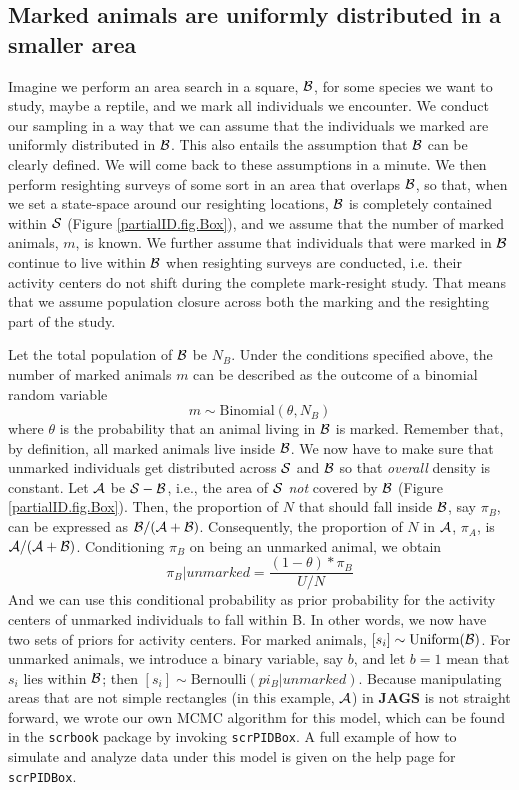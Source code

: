 \subsection{Marked animals are uniformly distributed in a smaller area}
Imagine we perform an area search in a square, ${\cal B}$, for some species we want to study, maybe a reptile, and we mark all individuals we encounter. We conduct our sampling in a way that we can assume that the individuals we marked are uniformly distributed in ${\cal B}$. This also entails the assumption that ${\cal B}$ can be clearly defined. We will come back to these assumptions in a minute. We then perform resighting surveys of some sort in an area that overlaps ${\cal B}$, so that, when we set a state-space around our resighting locations, ${\cal B}$ is completely contained within ${\cal S}$ (Figure \ref{partialID.fig.Box}), and we assume that the number of marked animals, $m$, is known. We further assume that individuals that were marked in ${\cal B}$ continue to live within ${\cal B}$ when resighting surveys are conducted, i.e. their activity centers do not shift during the complete mark-resight study. That means that we assume population closure across both the marking and the resighting part of the study.

Let the total population of ${\cal B}$ be $N_B$.
Under the conditions specified above, the number of marked animals $m$ can be described as the outcome of a binomial random variable
\[
m \sim \mbox{Binomial}(\theta, N_B)
\]
where $\theta$ is the probability that an animal living in ${\cal B}$ is marked. Remember that, by definition, all marked animals live inside ${\cal B}$. We now have to make sure that unmarked individuals get distributed across ${\cal S}$ and ${\cal B}$ so that \emph{overall} density is constant.
Let ${\cal A}$ be ${\cal S} - {\cal B}$, i.e., the area of ${\cal S}$ \emph{not} covered by ${\cal B}$ (Figure \ref{partialID.fig.Box}). Then, the proportion of $N$ that should fall inside ${\cal B}$, say $\pi_B$, can be expressed as ${\cal B}/({\cal A}+{\cal B})$. Consequently, the proportion of $N$ in ${\cal A}$, $\pi_A$, is ${\cal A}/({\cal A}+{\cal B})$.
Conditioning $\pi_B$ on being an unmarked animal, we obtain
\[
 \pi_B | unmarked = \frac{(1-\theta)* \pi_B}{U/N}
\]
And we can use this conditional probability as prior probability for the activity centers of unmarked individuals to fall within {\cal B}.
In other words, we now have two sets of priors for activity centers. For marked animals, $[s_i]\sim \mbox{Uniform}({\cal B})$. For unmarked animals, we introduce a binary variable, say $b$, and let $b=1$ mean that $s_i$ lies within ${\cal B}$; then $[s_i]\sim \mbox{Bernoulli}(pi_B|unmarked)$.
Because manipulating areas that are not simple rectangles (in this example, ${\cal A}$) in {\bf JAGS} is not straight forward, we wrote our own MCMC algorithm for this model, which can be found in the {\tt scrbook} package by invoking {\tt scrPIDBox}. A full example of how to simulate and analyze data under this model is given on the help page for {\tt scrPIDBox}.

